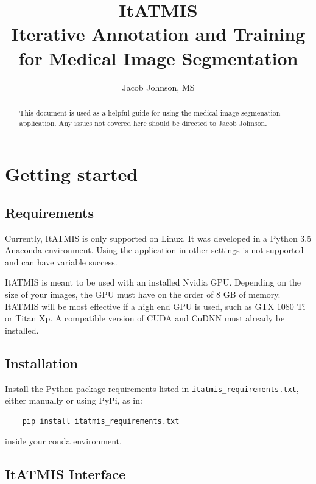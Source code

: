 \documentclass[twoside,a4paper]{refart}
\title{\mdseries \textbf{ItATMIS} \\ \textbf{It}erative \textbf{A}nnotation and \textbf{T}raining for \textbf{M}edical \textbf{I}mage \textbf{S}egmentation}
\author{Jacob Johnson, MS}
\date{}
\begin{document}
\maketitle

\begin{abstract}
        This document is used as a helpful guide for using the medical image segmenation application. Any issues not covered here should be directed to \href{mailto:jmjohnson33@wisc.edu}{Jacob Johnson}.
\end{abstract}

\tableofcontents

\newpage

\section{Getting started}
\subsection{Requirements}
Currently, ItATMIS is only supported on Linux. It was developed in a Python 3.5 Anaconda environment. Using the application in other settings is not supported and can have variable success.

ItATMIS is meant to be used with an installed Nvidia GPU. Depending on the size of your images, the GPU must have on the order of 8 GB of memory. ItATMIS will be most effective if a high end GPU is used, such as GTX 1080 Ti or Titan Xp. A compatible version of CUDA and CuDNN must already be installed. 
\subsection{Installation}
Install the Python package requirements listed in \texttt{itatmis_requirements.txt}, either manually or using PyPi, as in:
\begin{verbatim}
	pip install itatmis_requirements.txt
\end{verbatim}
inside your conda environment.

\subsection{ItATMIS Interface}
\end{document}
